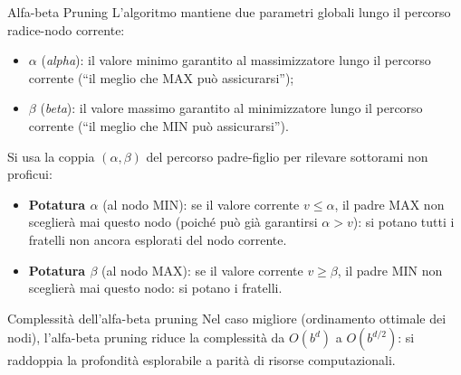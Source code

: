 \documentclass[12pt,a4paper,twoside]{book}
\theoremstyle{plain}
\theoremstyle{definition}
\begin{document}
\begin{defbox}{Alfa-beta Pruning}
L'algoritmo mantiene due parametri globali lungo il percorso radice-nodo corrente:
\begin{itemize}
  \item $\alpha$ (\emph{alpha}): il valore minimo garantito al massimizzatore lungo il percorso corrente (``il meglio che MAX può assicurarsi'');
  \item $\beta$ (\emph{beta}): il valore massimo garantito al minimizzatore lungo il percorso corrente (``il meglio che MIN può assicurarsi'').
\end{itemize}
Si usa la coppia $(\alpha,\beta)$ del percorso padre-figlio per rilevare sottorami non proficui:
\begin{itemize}
  \item \textbf{Potatura $\alpha$} (al nodo MIN): se il valore corrente $v \le \alpha$, il padre MAX non sceglierà mai questo nodo (poiché può già garantirsi $\alpha>\mathit{v}$): si potano tutti i fratelli non ancora esplorati del nodo corrente.
  \item \textbf{Potatura $\beta$} (al nodo MAX): se il valore corrente $v \ge \beta$, il padre MIN non sceglierà mai questo nodo: si potano i fratelli.
\end{itemize}
\end{defbox}

\begin{thmbox}{Complessità dell'alfa-beta pruning}
Nel caso migliore (ordinamento ottimale dei nodi), l'alfa-beta pruning riduce la complessità da $O(b^d)$ a $O(b^{d/2})$: si raddoppia la profondità esplorabile a parità di risorse computazionali.
\end{thmbox}
\end{document}
